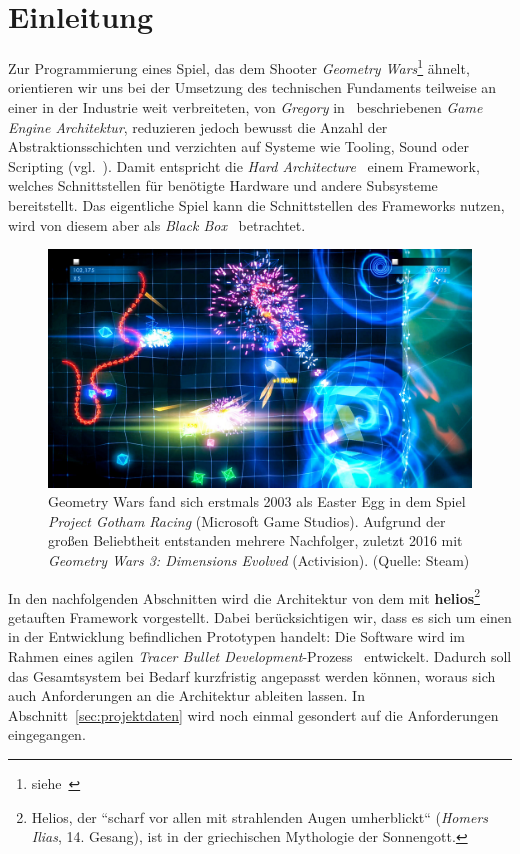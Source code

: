 \section{Einleitung}

Zur Programmierung eines Spiel, das dem Shooter \textit{Geometry Wars}\footnote{siehe~\cite[]{WikipediaGeometryWars}} ähnelt, orientieren wir uns bei der Umsetzung des technischen Fundaments teilweise an einer in der Industrie weit verbreiteten, von \textit{Gregory} in~\cite[]{Gre19} beschriebenen \textit{Game Engine Architektur}, reduzieren jedoch bewusst die Anzahl der Abstraktionsschichten und verzichten auf Systeme wie Tooling, Sound oder Scripting (vgl.~\cite[\textbf{Figure 1.16}, 39]{Gre19}).
Damit entspricht die \textit{Hard Architecture}~\cite[]{RM04} einem Framework, welches Schnittstellen für benötigte Hardware und andere Subsysteme bereitstellt.
Das eigentliche Spiel kann die Schnittstellen des Frameworks nutzen, wird von diesem aber als \textit{Black Box}~\cite[]{RB88} betrachtet.\\

\begin{figure}[!h]
    \centering
    \includegraphics[width=1\columnwidth]{img/geometry_wars}
    \caption{Geometry Wars fand sich erstmals 2003 als Easter Egg in dem Spiel \textit{Project Gotham Racing} (Microsoft Game Studios). Aufgrund der großen Beliebtheit entstanden mehrere Nachfolger, zuletzt 2016 mit \textit{Geometry Wars 3: Dimensions Evolved} (Activision). (Quelle: Steam)}
    \label{fig:geometry_wars}
\end{figure}

In den nachfolgenden Abschnitten wird die Architektur von dem mit \textbf{helios}\footnote{
    Helios, der ``scharf vor allen mit strahlenden Augen umherblickt`` (\textit{Homers Ilias}, 14. Gesang), ist in der griechischen Mythologie der Sonnengott.
} getauften Framework vorgestellt.
Dabei berücksichtigen wir, dass es sich um einen in der Entwicklung befindlichen Prototypen handelt:
Die Software wird im Rahmen eines agilen \textit{Tracer Bullet Development}-Prozess~\cite[50 f.]{TH20} entwickelt.
Dadurch soll das Gesamtsystem bei Bedarf kurzfristig angepasst werden können, woraus sich auch Anforderungen an die Architektur ableiten lassen.
In Abschnitt~\ref{sec:projektdaten} wird noch einmal gesondert auf die Anforderungen eingegangen. \\

